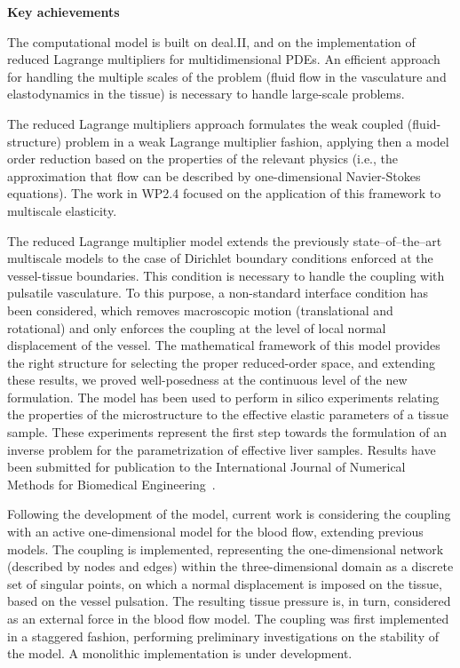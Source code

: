 \documentclass[a4paper,12pt, numbers]{article}
\begin{document}
\noindent\textbf{Key achievements}

The computational model is built on deal.II, and on the implementation of reduced Lagrange multipliers for multidimensional PDEs. An efficient approach for handling the multiple scales of the problem (fluid flow in the vasculature and elastodynamics in the tissue) is necessary to handle large-scale problems.

The reduced Lagrange multipliers approach formulates the weak coupled (fluid-structure) problem in a weak Lagrange multiplier fashion, applying then a model order reduction based on the properties of the relevant physics (i.e., the approximation that flow can be described by one-dimensional Navier-Stokes equations). The work in WP2.4 focused on the application of this framework to multiscale elasticity.

The reduced Lagrange multiplier model extends the previously state--of--the--art multiscale models to the case of Dirichlet boundary conditions enforced at the vessel-tissue boundaries. This condition is necessary to handle the coupling with pulsatile vasculature. To this purpose, a non-standard interface condition has been considered, which removes macroscopic motion (translational and rotational) and only enforces the coupling at the level of local normal displacement of the vessel. The mathematical framework of this model provides the right structure for selecting the proper reduced-order space, and extending these results, we proved well-posedness at the continuous level of the new formulation. The model has been used to perform in silico experiments relating the properties of the microstructure to the effective elastic parameters of a tissue sample. These experiments represent the first step towards the formulation of an inverse problem for the parametrization of effective liver samples. Results have been submitted for publication to the International Journal of Numerical Methods for Biomedical Engineering~\cite{belponer2025}.

Following the development of the model, current work is considering the coupling with an active one-dimensional model for the blood flow, extending previous models. The coupling is implemented, representing the one-dimensional network (described by nodes and edges) within the three-dimensional domain as a discrete set of singular points, on which a normal displacement is imposed on the tissue, based on the vessel pulsation. The resulting tissue pressure is, in turn, considered as an external force in the blood flow model. The coupling was first implemented in a staggered fashion, performing preliminary investigations on the stability of the model. A monolithic implementation is under development.
\end{document}
